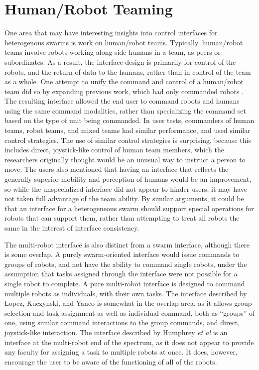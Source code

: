 \section{Human/Robot Teaming} \label{section:human_robot_teaming}

One area that may have interesting insights into control interfaces for heterogenous swarms is work on human/robot teams. 
Typically, human/robot teams involve robots working along side humans in a team, as peers or subordinates. 
As a result, the interface design is primarily for control of the robots, and the return of data to the humans, rather than in control of the team as a whole.
One attempt to unify the command and control of a human/robot team did so by expanding previous work, which had only commanded robots \citep{lopez2017unified}. 
The resulting interface allowed the end user to command robots and humans using the same command modalities, rather than specializing the command set based on the type of unit being commanded. 
In user tests, commanders of human teams, robot teams, and mixed teams had similar performance, and used similar control strategies.
The use of similar control strategies is surprising, because this includes direct, joystick-like control of human team members, which the researchers originally thought would be an unusual way to instruct a person to move. 
The users also mentioned that having an interface that reflects the generally superior mobility and perception of humans would be an improvement, so while the unspecialized interface did not appear to hinder users, it may have not taken full advantage of the team ability. 
By similar arguments, it could be that an interface for a heterogeneous swarm should support special operations for robots that can support them, rather than attempting to treat all robots the same in the interest of interface consistency. 

The multi-robot interface is also distinct from a swarm interface, although there is some overlap. 
A purely swarm-oriented interface would issue commands to groups of robots, and not have the ability to command single robots, under the assumption that tasks assigned through the interface were not possible for a single robot to complete. 
A pure multi-robot interface is designed to command multiple robots as individuals, with their own tasks. 
The interface described by Lopez, Kuczynski, and Yanco is somewhat in the overlap area, as it allows group selection and task assignment as well as individual command, both as ``groups'' of one, using similar command interactions to the group commands, and direct, joystick-like interaction. 
The interface described by Humphrey \emph{et al} is an interface at the multi-robot end of the spectrum, as it does not appear to provide any faculty for assigning a task to multiple robots at once.
It does, however, encourage the user to be aware of the functioning of all of the robots. 

